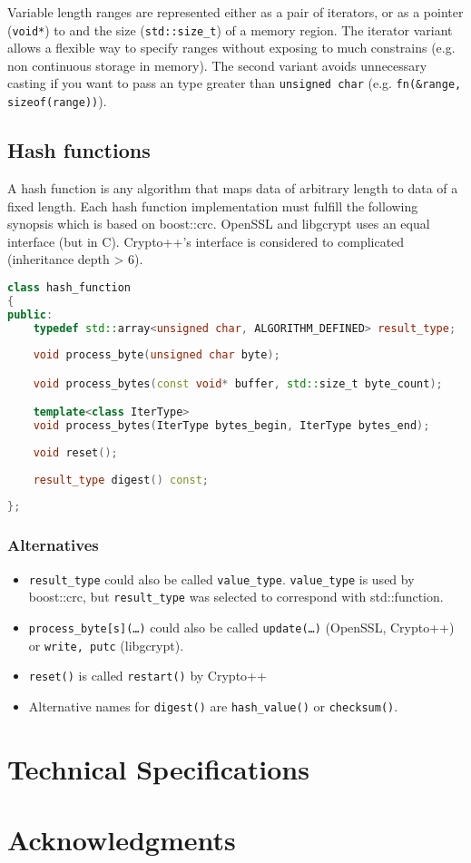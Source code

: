 \documentclass[10pt,letterpaper]{article}
\begin{document}
Variable length ranges are represented either as a pair of iterators, or as a pointer (\texttt{void*}) to and the size (\texttt{std::size\_t}) of a memory region. The iterator variant allows a flexible way to specify ranges without exposing to much constrains (e.g. non continuous storage in memory). The second variant avoids unnecessary casting if you want to pass an type greater than \texttt{unsigned char} (e.g. \texttt{fn(\&range, sizeof(range))}).

\subsection{Hash functions}
A hash function is any algorithm that maps data of arbitrary length to data of a fixed length. %
Each hash function implementation must fulfill the following synopsis which is based on boost::crc. OpenSSL and libgcrypt uses an equal interface (but in C). Crypto++'s interface is considered to complicated (inheritance depth > 6).
\begin{lstlisting}[language=C++]
class hash_function
{
public:
	typedef std::array<unsigned char, ALGORITHM_DEFINED> result_type;
		
	void process_byte(unsigned char byte);

	void process_bytes(const void* buffer, std::size_t byte_count);

	template<class IterType>
	void process_bytes(IterType bytes_begin, IterType bytes_end);
	
	void reset();
	
	result_type digest() const;
	
};
\end{lstlisting}
\subsubsection*{Alternatives}
\begin{itemize}
\item \texttt{result\_type} could also be called \texttt{value\_type}. \texttt{value\_type} is used by boost::crc, but \texttt{result\_type} was selected to correspond with std::function.

\item \texttt{process\_byte[s](\dots)} could also be called \texttt{update(\dots)} (OpenSSL, Crypto++) or \texttt{write, putc} (libgcrypt).

\item \texttt{reset()} is called \texttt{restart()} by Crypto++

\item Alternative names for \texttt{digest()} are \texttt{hash\_value()} or \texttt{checksum()}.
\end{itemize}

\section{Technical Specifications}

\section{Acknowledgments}
\end{document}
